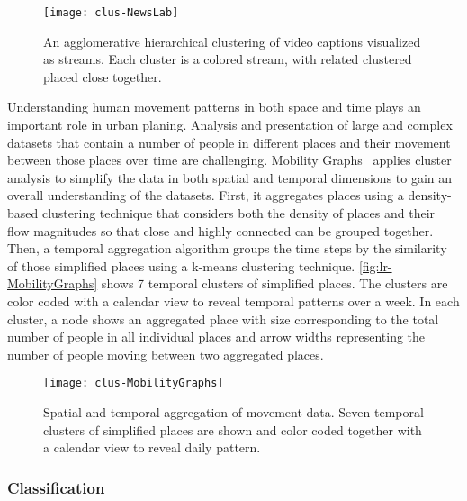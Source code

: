 \begin{figure}
	\centering
	\texttt{[image: clus-NewsLab]}
	\caption[An agglomerative hierarchical clustering of video captions]{An agglomerative hierarchical clustering of video captions visualized as streams. Each cluster is a colored stream, with related clustered placed close together. }
	\label{fig:lr-NewsLab}
\end{figure}

Understanding human movement patterns in both space and time plays an important role in urban planing. Analysis and presentation of large and complex datasets that contain a number of people in different places and their movement between those places over time are challenging. Mobility Graphs~\cite{Landesberger2016} applies cluster analysis to simplify the data in both spatial and temporal dimensions to gain an overall understanding of the datasets. First, it aggregates places using a density-based clustering technique that considers both the density of places and their flow magnitudes so that close and highly connected can be grouped together. Then, a temporal aggregation algorithm groups the time steps by the similarity of those simplified places using a k-means clustering technique. \autoref{fig:lr-MobilityGraphs} shows 7 temporal clusters of simplified places. The clusters are color coded with a calendar view to reveal temporal patterns over a week. In each cluster, a node shows an aggregated place with size corresponding to the total number of people in all individual places and arrow widths representing the number of people moving between two aggregated places.

\begin{figure}
	\centering
	\texttt{[image: clus-MobilityGraphs]}
	\caption[Spatial and temporal aggregation of movement data]{Spatial and temporal aggregation of movement data. Seven temporal clusters of simplified places are shown and color coded together with a calendar view to reveal daily pattern. }
	\label{fig:lr-MobilityGraphs}
\end{figure}

\subsubsection{Classification}
